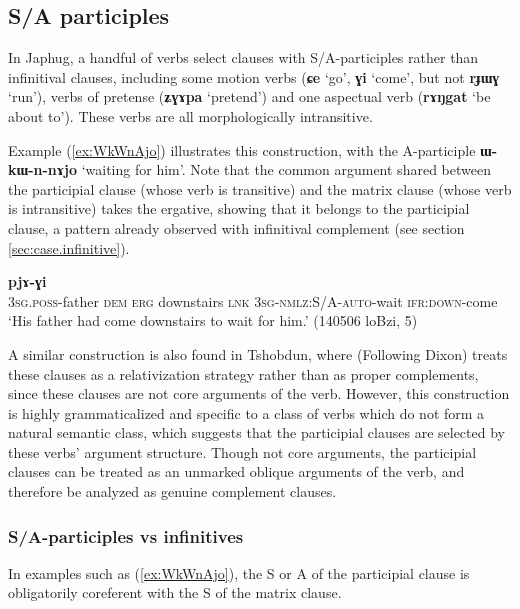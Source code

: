\documentclass[oldfontcommands,oneside,a4paper,11pt]{article}
\newcommand{\ipa}[1]{\textbf{\phon#1}} %
\newcommand{\jpg}[2]{\ipa{#1} `#2'} %
\begin{document}
 \subsection{S/A participles} \label{sec:SApart}
In Japhug, a handful of verbs select clauses with S/A-participles rather than infinitival clauses, including  some motion verbs (\jpg{ɕe}{go}, \jpg{ɣi}{come}, but not \jpg{rɟɯɣ}{run}), verbs of pretense (\jpg{ʑɣɤpa}{pretend}) and one aspectual verb  (\jpg{rɤŋgat}{be about to}). These verbs are all morphologically intransitive.

Example (\ref{ex:WkWnAjo}) illustrates this construction, with the A-participle \ipa{ɯ-kɯ-n-nɤjo} `waiting for him'. Note that the common argument shared between the participial clause (whose verb is transitive) and the matrix clause (whose verb is intransitive) takes the ergative, showing that it belongs to the participial clause, a pattern already observed with infinitival complement (see section \ref{sec:case.infinitive}).

\begin{exe}
\ex \label{ex:WkWnAjo}
\gll [\ipa{ɯ-wa} 	\ipa{nɯ} 	\ipa{kɯ} 	\ipa{kʰapa} 	\ipa{tɕe} 	\ipa{ɯ-kɯ-n-nɤjo}] 	\ipa{pjɤ-ɣi} \\
\textsc{3sg.poss}-father \textsc{dem} \textsc{erg} downstairs \textsc{lnk} \textsc{3sg-nmlz:S/A-auto}-wait \textsc{ifr:down}-come \\
\glt `His father had come downstairs to wait for him.' (140506 loBzi, 5)
\end{exe}


A similar construction is also found in Tshobdun, where \citet{sun12complementation} (Following Dixon) treats these clauses as a relativization strategy rather than as proper complements, since these clauses are not core arguments of the verb. However, this construction is highly grammaticalized and specific to a class of verbs which do not form a natural semantic class, which suggests that the participial clauses are selected by these verbs' argument structure. Though not core arguments, the participial clauses can be treated as an unmarked oblique arguments of the verb, and therefore be analyzed as genuine complement clauses.

\subsubsection{S/A-participles vs infinitives} \label{sec:SAparticiple.coref}
In examples such as (\ref{ex:WkWnAjo}), the S or A of the participial clause is obligatorily coreferent with the S of the matrix clause.
\end{document}
